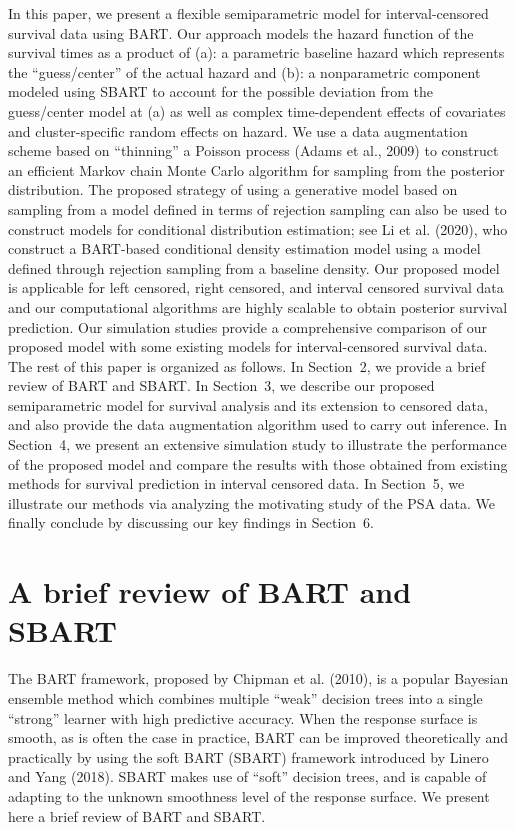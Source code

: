 \documentclass[11pt]{article}
\begin{document}
 In this paper, we present a flexible semiparametric model for interval-censored survival data using BART. Our approach models the hazard function of the survival times as a product of (a): a parametric baseline hazard which represents the ``guess/center'' of the actual hazard  and (b): a nonparametric component modeled using SBART to account for the  possible deviation from the guess/center model at (a)  as well as complex time-dependent effects of covariates and cluster-specific random effects on hazard. We use a data augmentation scheme based on ``thinning'' a Poisson process (Adams et al., 2009) to construct an efficient Markov chain Monte Carlo algorithm for sampling from the posterior distribution. The proposed strategy of using a generative model based on sampling from a model defined in terms of rejection sampling can also be used to construct models for conditional distribution estimation; see Li et al. (2020), who construct a BART-based conditional density estimation model using a model defined through rejection sampling from a baseline density. Our proposed model is applicable for left censored, right censored, and interval censored survival data and our computational algorithms are highly scalable to obtain posterior survival prediction. Our simulation studies provide a comprehensive comparison of our proposed model with some existing models for interval-censored survival data. The rest of this paper is organized as follows. In Section~2, we provide a brief review of BART and SBART. In Section~3, we describe our proposed semiparametric model for survival analysis and its extension to censored data, and also provide the data augmentation algorithm used to carry out inference. In Section~4, we present an extensive simulation study to illustrate the performance of the proposed model and compare the results with those obtained from existing methods for survival prediction in interval censored data. In Section~5, we illustrate our methods via analyzing the motivating study of the PSA data. We finally conclude by discussing our key findings in Section~6.

 
 
 \section{A brief review of BART and SBART}
 
The BART framework, proposed by Chipman et al. (2010), is a popular Bayesian ensemble method which combines multiple ``weak'' decision trees into a single ``strong'' learner with high predictive accuracy. When the response surface is smooth, as is often the case in practice, BART can be improved theoretically and practically by using the soft BART (SBART) framework introduced by Linero and Yang (2018). SBART makes use of ``soft'' decision trees, and is capable of adapting to the unknown smoothness level of the response surface. We present here a brief review of BART and SBART.
 
\end{document}
